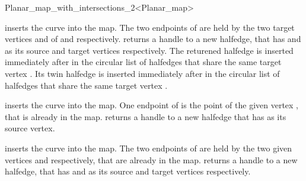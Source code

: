 \begin{ccRefClass}{Planar_map_with_intersections_2<Planar_map>}
\begin{ccAdvanced}
  {inserts the curve  into the map. The two endpoints of
   are held by the two target vertices  and 
  of  and 
  respectively.  returns a
  handle to a new halfedge, that has  and  as its
  source and target vertices respectively. The returened halfedge is
  inserted immediately after  in the  circular list of
  halfedges that share the same target vertex . Its twin
  halfedge is inserted immediately after  in the circular list
  of halfedges that share the same target vertex .
  }

  {inserts the curve  into the map. One endpoint of 
  is the point of the given vertex , that is already in the
  map.  returns a handle to a
  new halfedge that has  as its source vertex.
  }
  
  {inserts the curve  into the map. The two endpoints of
   are held by the two given vertices  and 
  respectively, that are already in the
  map.  returns a handle to
  a new halfedge, that has  and  as its source and
  target vertices respectively.
  }

\end{ccAdvanced}

\end{ccRefClass}

\ccRefPageEnd

